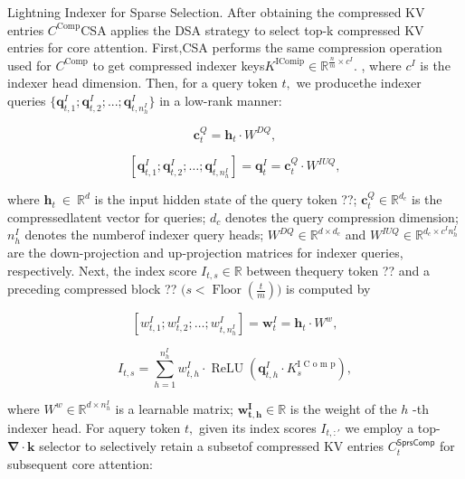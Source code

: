 \documentclass[
  10
]{article}
\begin{document}
Lightning Indexer for Sparse Selection. After obtaining the compressed
KV entries \(C ^ { \mathrm { C o m p } }\)CSA applies the DSA strategy
to select top-k compressed KV entries for core attention. First,CSA
performs the same compression operation used for
\(C ^ { \mathrm { C o m p } }\) to get compressed indexer
keys\(K ^ { \mathrm { I C o m i p } } \in \mathbb { R } ^ { \frac { n } { m } \times c ^ { I } } .\)
, where \(c ^ { I }\) is the indexer head dimension. Then, for a query
token \(t ,\) we producethe indexer queries
\(\{ \mathbf { q } _ { t , 1 } ^ { I } ; \mathbf { q } _ { t , 2 } ^ { I } ; . . . ; \mathbf { q } _ { t , n _ { h } ^ { I } } ^ { I } \}\)
in a low-rank manner:

\[
\mathbf {c} _ {t} ^ {Q} = \mathbf {h} _ {t} \cdot W ^ {D Q}, \tag {13}
\]

\[
[ \mathbf {q} _ {t, 1} ^ {I}; \mathbf {q} _ {t, 2} ^ {I}; \dots ; \mathbf {q} _ {t, n _ {h} ^ {I}} ^ {I} ] = \mathbf {q} _ {t} ^ {I} = \mathbf {c} _ {t} ^ {Q} \cdot W ^ {I U Q}, \tag {14}
\]

where \(\mathbf { h } _ { t } \ \in \ \mathbb { R } ^ { d }\) is the
input hidden state of the query token ??;
\(\mathbf { c } _ { t } ^ { Q } \in \mathbb { R } ^ { d _ { c } }\) is
the compressedlatent vector for queries; \(d _ { c }\) denotes the query
compression dimension; \(n _ { h } ^ { I }\) denotes the numberof
indexer query heads;
\(W ^ { D Q } \in \mathbb { R } ^ { d \times d _ { c } }\) and
\(W ^ { I U Q } \in \mathbb { R } ^ { d _ { c } \times c ^ { I } n _ { h } ^ { I } }\)
are the down-projection and up-projection matrices for indexer queries,
respectively. Next, the index score \(I _ { t , s } \in \mathbb { R }\)
between thequery token ?? and a preceding compressed block ??
\(\textstyle { \bigl ( } s < \operatorname { F l o o r } ( { \frac { t } { m } } ) { \bigr ) }\)
is computed by

\[
\left[ w _ {t, 1} ^ {I}; w _ {t, 2} ^ {I}; \dots ; w _ {t, n _ {h} ^ {I}} ^ {I} \right] = \mathbf {w} _ {t} ^ {I} = \mathbf {h} _ {t} \cdot W ^ {w}, \tag {15}
\]

\[
I _ {t, s} = \sum_ {h = 1} ^ {n _ {h} ^ {I}} w _ {t, h} ^ {I} \cdot \operatorname {R e L U} \left(\mathbf {q} _ {t, h} ^ {I} \cdot K _ {s} ^ {\text {I C o m p}}\right), \tag {16}
\]

where \(W ^ { w } \in \mathbb { R } ^ { d \times n _ { h } ^ { I } }\)
is a learnable matrix;
\(\boldsymbol { w _ { t , h } ^ { I } } \in \mathbb { R }\) is the
weight of the \(h\) -th indexer head. For aquery token \(t ,\) given its
index scores \(I _ { t , : \prime }\) we employ a top-
\(\mathbf { \nabla } \cdot \mathbf { k }\) selector to selectively
retain a subsetof compressed KV entries
\(C _ { t } ^ { \mathsf { S p r s C o m p } }\) for subsequent core
attention:
\end{document}
